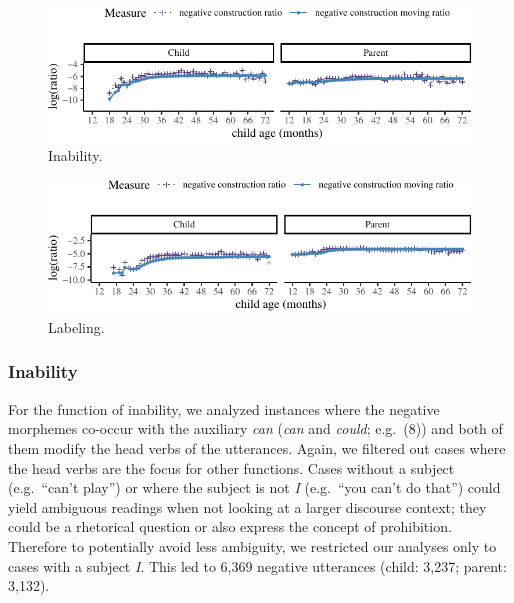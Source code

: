 \documentclass[10pt, letterpaper]{article}
\newenvironment{CodeChunk}{}{}
\begin{document}
\begin{figure}[h]

\begin{CodeChunk}


\begin{center}\includegraphics{figs/inability-1} \end{center}

\end{CodeChunk}
\caption[This image spans both columns]{Inability.}\label{fig:inability}
\end{figure}

\begin{figure}[h!]

\begin{CodeChunk}


\begin{center}\includegraphics{figs/learning-1} \end{center}

\end{CodeChunk}
\caption[This image spans both columns]{Labeling.}\label{fig:labeling}
\end{figure}

\hypertarget{inability}{%
\subsubsection{Inability}\label{inability}}

For the function of inability, we analyzed instances where the negative
morphemes co-occur with the auxiliary \emph{can} (\emph{can} and
\emph{could}; e.g.~(8)) and both of them modify the head verbs of the
utterances. Again, we filtered out cases where the head verbs are the
focus for other functions. Cases without a subject (e.g.~``can't play'')
or where the subject is not \emph{I} (e.g.~``you can't do that'') could
yield ambiguous readings when not looking at a larger discourse context;
they could be a rhetorical question or also express the concept of
prohibition. Therefore to potentially avoid less ambiguity, we
restricted our analyses only to cases with a subject \emph{I}. This led
to 6,369 negative utterances (child: 3,237; parent: 3,132).
\end{document}
